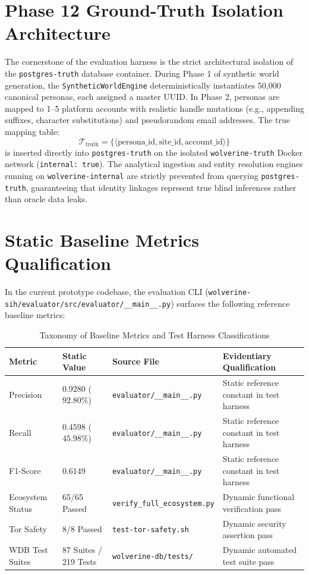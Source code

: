 \section{Phase 12 Ground-Truth Isolation Architecture}
\label{sec:phase12_groundtruth}

The cornerstone of the evaluation harness is the strict architectural isolation of the \texttt{postgres-truth} database container. During Phase 1 of synthetic world generation, the \texttt{SyntheticWorldEngine} deterministically instantiates 50,000 canonical personas, each assigned a master UUID. In Phase 2, personas are mapped to 1--5 platform accounts with realistic handle mutations (e.g., appending suffixes, character substitutions) and pseudorandom email addresses. The true mapping table:
\begin{equation}
\mathcal{T}_{\text{truth}} = \big\{ \langle \text{persona\_id}, \text{site\_id}, \text{account\_id} \rangle \big\}
\end{equation}
is inserted directly into \texttt{postgres-truth} on the isolated \texttt{wolverine-truth} Docker network (\texttt{internal: true}). The analytical ingestion and entity resolution engines running on \texttt{wolverine-internal} are strictly prevented from querying \texttt{postgres-truth}, guaranteeing that identity linkages represent true blind inferences rather than oracle data leaks.

\section{Static Baseline Metrics Qualification}
\label{sec:static_metrics_qualification}

In the current prototype codebase, the evaluation CLI (\texttt{wolverine-sih/evaluator/src/evaluator/\_\_main\_\_.py}) surfaces the following reference baseline metrics:

\begin{table}[htpb]
\centering
\small
\begin{tabular}{@{}llll@{}}
\toprule
\textbf{Metric} & \textbf{Static Value} & \textbf{Source File} & \textbf{Evidentiary Qualification} \\
\midrule
Precision & $0.9280$ ($92.80\%$) & \texttt{evaluator/\_\_main\_\_.py} & Static reference constant in test harness \\
Recall & $0.4598$ ($45.98\%$) & \texttt{evaluator/\_\_main\_\_.py} & Static reference constant in test harness \\
F1-Score & $0.6149$ & \texttt{evaluator/\_\_main\_\_.py} & Static reference constant in test harness \\
Ecosystem Status & 65/65 Passed & \texttt{verify\_full\_ecosystem.py} & Dynamic functional verification pass \\
Tor Safety & 8/8 Passed & \texttt{test-tor-safety.sh} & Dynamic security assertion pass \\
WDB Test Suites & 87 Suites / 219 Tests & \texttt{wolverine-db/tests/} & Dynamic automated test suite pass \\
\bottomrule
\end{tabular}
\caption{Taxonomy of Baseline Metrics and Test Harness Classifications}
\label{tab:eval_tax}
\end{table}


